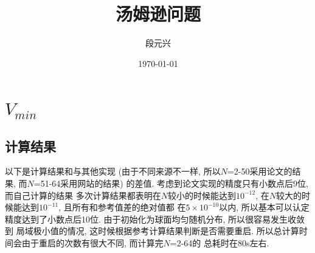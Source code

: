 \documentclass[UTF8]{ctexart}
\title{汤姆逊问题}
\author{段元兴}
\date{\today}
\begin{document}
\maketitle
\thispagestyle{empty}
\setcounter{page}{1}
\newpage
\tableofcontents
\newpage
    \section{$V_{min}$}
        \subsection{计算结果}
            \indent 以下是计算结果和与其他实现 (由于不同来源不一样, 所以$N$=2-50采用论文\cite{Lakhbab2014Energy}的结果,
            而$N$=51-64采用网站\cite{WikipediaThomsonProblem}的结果) 的差值. 考虑到论文实现的精度只有小数点后9位, 而自己计算的结果
            多次计算结果都表明在$N$较小的时候能达到$10^{-12}$, 在$N$较大的时候能达到$10^{-11}$, 且所有和参考值差的绝对值都
            在$5\times10^{-10}$以内, 所以基本可以认定精度达到了小数点后10位. 由于初始化为球面均匀随机分布, 所以很容易发生收敛到
            局域极小值的情况, 这时候根据参考计算结果判断是否需要重启. 所以总计算时间会由于重启的次数有很大不同, 而计算完$N$=2-64的
            总耗时在80s左右.
\end{document}
